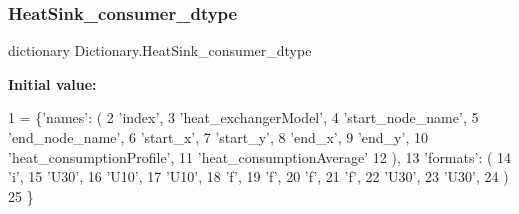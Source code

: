 \subsubsection{\texorpdfstring{Heat\+Sink\+\_\+consumer\+\_\+dtype}{HeatSink\_consumer\_dtype}}
{\footnotesize\ttfamily dictionary Dictionary.\+Heat\+Sink\+\_\+consumer\+\_\+dtype}

{\bfseries Initial value\+:}
\begin{DoxyCode}
1 = \{\textcolor{stringliteral}{'names'}: (
2                                 \textcolor{stringliteral}{'index'},
3                                 \textcolor{stringliteral}{'heat\_exchangerModel'},
4                                 \textcolor{stringliteral}{'start\_node\_name'},
5                                 \textcolor{stringliteral}{'end\_node\_name'},
6                                 \textcolor{stringliteral}{'start\_x'},
7                                 \textcolor{stringliteral}{'start\_y'},
8                                 \textcolor{stringliteral}{'end\_x'},
9                                 \textcolor{stringliteral}{'end\_y'},
10                                 \textcolor{stringliteral}{'heat\_consumptionProfile'},
11                                 \textcolor{stringliteral}{'heat\_consumptionAverage'}
12                                 ),
13                        \textcolor{stringliteral}{'formats'}: (
14                                 \textcolor{stringliteral}{'i'},
15                                 \textcolor{stringliteral}{'U30'},
16                                 \textcolor{stringliteral}{'U10'},
17                                 \textcolor{stringliteral}{'U10'},
18                                 \textcolor{stringliteral}{'f'},
19                                 \textcolor{stringliteral}{'f'},
20                                 \textcolor{stringliteral}{'f'},
21                                 \textcolor{stringliteral}{'f'},
22                                 \textcolor{stringliteral}{'U30'},
23                                 \textcolor{stringliteral}{'U30'},
24                                 )
25                                \}
\end{DoxyCode}
\mbox{\label{namespace_dictionary_a334d744a07f946e317946dbd8b5785bf}} 
